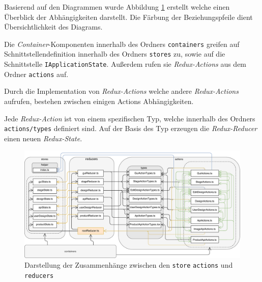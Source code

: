 Basierend auf den Diagrammen wurde Abbildung \ref{fig:Redux} erstellt welche einen Überblick der Abhängigkeiten darstellt. Die Färbung der Beziehungspfeile dient Übersichtlichkeit des Diagrams.

Die \emph{Container}-Komponenten innerhalb des Ordners \lstinline|containers| greifen auf Schnittstellendefinition innerhalb des Ordners \lstinline|stores| zu, sowie auf die Schnittstelle \lstinline|IApplicationState|. 
Außerdem rufen sie \emph{Redux-Actions} aus dem Ordner \lstinline|actions| auf.

Durch die Implementation von \emph{Redux-Actions} welche andere \emph{Redux-Actions} aufrufen, bestehen zwischen einigen  Actions Abhängigkeiten.  

Jede \emph{Redux-Action} ist von einem spezifischen Typ, welche innerhalb des Ordners \lstinline|actions/types| definiert sind. Auf der Basis des Typ erzeugen die \emph{Redux-Reducer} einen neuen \emph{Redux-State}.

\begin{figure}[H]
    \centering
    \includegraphics[width=1\textwidth]{diagrams/Ist-Architektur/Redux.pdf}
    \caption{Darstellung der Zusammenhänge zwischen den \lstinline|store| \lstinline|actions| und \lstinline|reducers|}
    \label{fig:Redux}
\end{figure}



